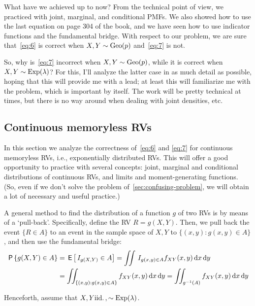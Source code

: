 \documentclass[a4paper,12pt]{article}
\begin{document}
What have we achieved up to now?
From the technical point of view, we practiced with joint, marginal, and conditional PMFs.
We also showed how to use the last equation on page 304 of the book, and we have seen how to use indicator functions and the fundamental bridge.
With respect to our problem, we are sure that~\eqref{eq:6} is correct when $X, Y \sim \mathrm{Geo}(p)$ and~\cref{eq:7} is not.

So, why is~\eqref{eq:7} incorrect when $X, Y\sim\mathrm{Geo}(p)$, while it is correct when $X,Y\sim\mathrm{Exp}(\lambda)$?
For this, I'll analyze the latter case in as much detail as possible, hoping that this will provide me with a lead; at least this will familiarize me with the problem, which is important by itself.
The work will be pretty technical at times, but there is no way around when dealing with joint densities, etc.



\subsection{Continuous memoryless RVs}
\label{sec:exerc-expon-distr}

In this section we analyze the correctness of~\cref{eq:6} and \cref{eq:7} for continuous memoryless RVs, i.e., exponentially distributed RVs.
This will offer a good opportunity to practice with several concepts: joint, marginal and conditional distributions of continuous RVs, and limits and moment-generating functions.
(So, even if we don't solve the problem of~\cref{sec:confusing-problem}, we will obtain a lot of necessary and useful practice.)

A general method to find the distribution of a function $g$ of two RVs is by means of a `pull-back'. Specifically, define the RV $R=g(X,Y)$. Then,  we pull back the event $\{R \in A\}$ to an event in the sample space of $X,Y$ to $\{(x,y) : g(x,y)\in A\}$, and then use the fundamental bridge: 
\begin{equation}\label{eq:54}
  \begin{split}
\,\mathsf{P}\left\{g(X, Y) \in A\right\} 
&= \,\mathsf{E}\left[\,I_{g(X,Y)}\in A\right] 
= \iint \,I_{g(x,y) \in A} f_{XY}(x,y) \,\textrm{d}x \,\textrm{d}y \\
&= \iint_{\{(x,y): g(x,y) \in A\}} f_{XY}(x,y) \,\textrm{d}x \,\textrm{d}y 
= \iint_{g^{-1}(A)} f_{XY}(x, y) \,\textrm{d}x \,\textrm{d}y 
  \end{split}
\end{equation} 


Henceforth, assume that $X, Y \mathrm{iid.}\,, \sim \mathrm{Exp}(\lambda)$.
\end{document}

